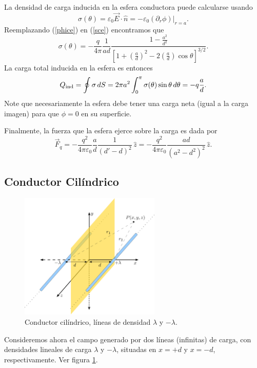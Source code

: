La densidad de carga inducida en la esfera conductora puede calcularse usando
\begin{equation}\label{sce}
 \sigma(\theta)=\varepsilon_0\vec{E}\cdot\hat{n}
=-\varepsilon_0\left.(\partial_r\phi)\right|_{r=a}.
\end{equation}
Reemplazando (\ref{phice}) en (\ref{sce}) encontramos que
\begin{equation}
 \sigma(\theta)=-\frac{q}{4\pi}\frac{1}{ad}\frac{1-\frac{a^2}{d^2
}}{\left[1+\left(\frac{a}{d}\right)^2-2\left(\frac{a}{d}\right)\cos\theta\right]
^{3/2}}.
\end{equation}
La carga total inducida en la esfera es entonces
\begin{equation}
 Q_{\rm ind}=\oint\sigma\,dS=2\pi
a^2\int_0^\pi\sigma(\theta)\sin\theta\,d\theta=-q\frac{a}{d}.
\end{equation}
Note que necesariamente la esfera debe tener una carga neta (igual a la carga imagen) para que $\phi=0$ en su superficie.

Finalmente, la fuerza que la esfera ejerce sobre la carga es dada por
\begin{equation}
\vec{F}_q=-\frac{q^2}{4\pi\varepsilon_0}\frac{a}{d}\frac{1}{(d'-d)^2}\,
\hat{z}=-\frac { q^2 }{4\pi\varepsilon_0}\frac{ad}{(a^2-d^2)^2}\,\hat{z}.
\end{equation}

\subsection{Conductor Cilíndrico}
\begin{figure}[!h]
\centerline{\includegraphics[height=6cm]{fig/fig-metodo-imagenes-cilindros-01.pdf}}
\caption{Conductor cilíndrico, líneas de densidad $\lambda$ y $-\lambda$.}
\label{ci03}
\end{figure}
Consideremos ahora el campo generado por dos líneas (infinitas) de carga, con
densidades lineales de carga $\lambda$ y $-\lambda$, situadas en $x=+d$ y
$x=-d$, respectivamente. Ver figura \ref{ci03}.

